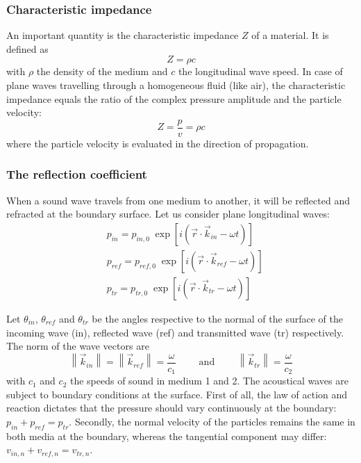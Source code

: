 \subsubsection*{Characteristic impedance}
An important quantity is the characteristic impedance $Z$ of a material. It is defined as 
\[
Z = \rho c
\]
with $\rho$ the density of the medium and $c$ the longitudinal wave speed. In case of plane waves travelling through a homogeneous fluid (like air), the characteristic impedance equals the ratio of the complex pressure amplitude and the particle velocity:
\[
Z = \frac{p}{v} = \rho c
\]
where the particle velocity is evaluated in the direction of propagation.


\subsubsection*{The reflection coefficient}
When a sound wave travels from one medium to another, it will be reflected and refracted at the boundary surface. Let us consider plane longitudinal waves:
\begin{align*}
&p_{in} = p_{in,0}\; \exp\left[ i (\vec{r} \cdot \vec{k}_{in} -  \omega t )\right]\\
&p_{ref} = p_{ref,0}\; \exp\left[ i (\vec{r} \cdot \vec{k}_{ref} -  \omega t )\right]\\
&p_{tr} = p_{tr,0}\; \exp\left[ i (\vec{r} \cdot \vec{k}_{tr} -  \omega t )\right]
\end{align*}

Let $\theta_{in}$, $\theta_{ref}$ and $\theta_{tr}$ be the angles respective to the normal of the surface of the incoming wave (in), reflected  wave (ref) and transmitted  wave (tr) respectively. The norm of the wave vectors are 
\[
\left\|\vec{k}_{in}\right\| = \left\|\vec{k}_{ref}\right\| = \frac{\omega}{c_1} \qquad \textrm{ and } \qquad \left\|\vec{k}_{tr}\right\| = \frac{\omega}{c_2}
\]
with $c_1$ and $c_2$ the speeds of sound in medium 1 and 2. The acoustical waves are subject to boundary conditions at the surface. First of all, the law of action and reaction dictates that the pressure should vary continuously at the boundary: $p_{in} + p_{ref} = p_{tr}$.
Secondly, the normal velocity of the particles remains the same in both media at the boundary, whereas the tangential component may differ: $v_{in,n} + v_{ref,n} = v_{tr,n}$.

